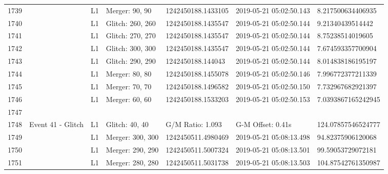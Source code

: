 \begin{longtable}{lllllll}
1739 &                                                    &       L1 &    Merger: 90, 90 &  1242450188.1433105 &  2019-05-21 05:02:50.143 &   8.217500634406935 \\
1740 &                                                    &       L1 &  Glitch: 260, 260 &  1242450188.1435547 &  2019-05-21 05:02:50.144 &    9.21340439514442 \\
1741 &                                                    &       L1 &  Glitch: 270, 270 &  1242450188.1435547 &  2019-05-21 05:02:50.144 &    8.75238514019605 \\
1742 &                                                    &       L1 &  Glitch: 300, 300 &  1242450188.1435547 &  2019-05-21 05:02:50.144 &   7.674593357700904 \\
1743 &                                                    &       L1 &  Glitch: 290, 290 &   1242450188.144043 &  2019-05-21 05:02:50.144 &   8.014838186195197 \\
1744 &                                                    &       L1 &    Merger: 80, 80 &  1242450188.1455078 &  2019-05-21 05:02:50.146 &   7.996772377211339 \\
1745 &                                                    &       L1 &    Merger: 70, 70 &  1242450188.1496582 &  2019-05-21 05:02:50.150 &   7.732967682921397 \\
1746 &                                                    &       L1 &    Merger: 60, 60 &  1242450188.1533203 &  2019-05-21 05:02:50.153 &  7.0393867165242945 \\
1747 &                                                    &          &                   &                     &                          &                     \\
1748 &                                  Event 41 - Glitch &       L1 &    Glitch: 40, 40 &    G/M Ratio: 1.093 &        G-M Offset: 0.41s &  124.07857546524777 \\
1749 &                                                    &       L1 &  Merger: 300, 300 &  1242450511.4980469 &  2019-05-21 05:08:13.498 &   94.82375906120068 \\
1750 &                                                    &       L1 &  Merger: 290, 290 &  1242450511.5007324 &  2019-05-21 05:08:13.501 &   99.59053729072181 \\
1751 &                                                    &       L1 &  Merger: 280, 280 &  1242450511.5031738 &  2019-05-21 05:08:13.503 &  104.87542761350987 \\

\end{longtable}
